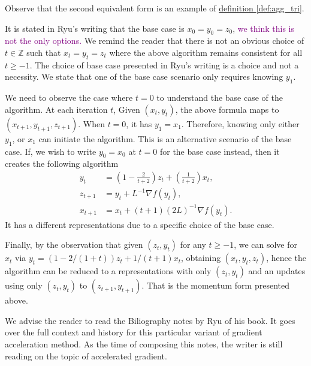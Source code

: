 \documentclass[12pt]{article}
\begin{document}
        \begin{observation}
            Observe that the second equivalent form is an example of \hyperref[def:agg_tri]{definition \ref*{def:agg_tri}}. 
            \par\noindent
            It is stated in Ryu's writing that the base case is $x_0 = y_0 = z_0$, 
            \textcolor{purple}{we think this is not the only options.} 
            We remind the reader that there is not an obvious choice of $t\in \mathbb Z$ such that $x_t = y_t = z_t$ where the above algorithm remains consistent for all $t \ge -1$. 
            The choice of base case presented in Ryu's writing is a choice and not a necessity. 
            We state that one of the base case scenario only requires knowing $y_1$. 
            
            \par\noindent 
            We need to observe the case where $t = 0$ to understand the base case of the algorithm. 
            At each iteration $t$, Given $(x_t, y_t)$, the above formula maps to $(x_{t + 1}, y_{t + 1}, z_{t + 1})$. 
            When $t= 0$, it has $y_1 = x_1$. 
            Therefore, knowing only either $y_1$, or $x_1$ can initiate the algorithm. 
            This is an alternative scenario of the base case. 
            If, we wish to write $y_0 = x_0$ at $t = 0$ for the base case instead, then it creates the following algorithm 
            \begin{align*}
                y_{t} &= \left(
                1 - \frac{2}{t + 2} 
                \right)z_{t} + 
                \left(
                    \frac{1}{t + 2}
                \right)x_{t}, 
                \\
                z_{t + 1} &= y_t + L^{-1}\nabla f(y_t), 
                \\
                x_{t + 1} &= x_t + (t + 1)(2L)^{-1}\nabla f(y_t). 
            \end{align*}
            It has a different representations due to a specific choice of the base case. 
            \par\noindent
            Finally, by the observation that given $(z_t, y_t)$ for any $t\ge -1$, we can solve for $x_t$ \newline via $y_t = (1 - 2/(1 + t))z_t + 1/(t + 1)x_t$, obtaining $(x_t, y_t, z_t)$, hence the algorithm can be reduced to a representations with only $(z_t, y_t)$ and an updates using only $(z_t, y_t)$ to $(z_{t + 1}, y_{t + 1})$. 
            That is the momentum form presented above. 


        \end{observation}
        We advise the reader to read the Biliography notes by Ryu \cite[chapter 12]{ryu_large-scale_2022} of his book. 
        It goes over the full context and history for this particular variant of gradient acceleration method. 
        As the time of composing this notes, the writer is still reading on the topic of accelerated gradient. 
        
\end{document}
